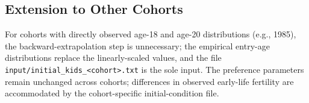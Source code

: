 \subsection{Extension to Other Cohorts}

For cohorts with directly observed age-18 and age-20 distributions (e.g., 1985), the backward-extrapolation step is unnecessary; the empirical entry-age distributions replace the linearly-scaled values, and the file \texttt{input/initial\_kids\_<cohort>.txt} is the sole input. The preference parameters remain unchanged across cohorts; differences in observed early-life fertility are accommodated by the cohort-specific initial-condition file.
